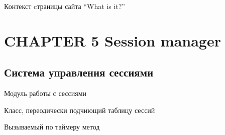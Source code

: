 \documentclass[letterpaper,10pt,english]{sphinxmanual}
\begin{document}
\begin{fulllineitems}
\begin{fulllineitems}
\end{fulllineitems}


\begin{fulllineitems}
\label{messageManager:mainServer.messageManager.MessageManager.whatContext}
Контекст cтраницы сайта ``What is it?''

\end{fulllineitems}


\end{fulllineitems}



\chapter{CHAPTER 5 Session manager}
\label{sessionManager::doc}\label{sessionManager:chapter-5-session-manager}

\section{Система управления сессиями}
\label{sessionManager:id1}\label{sessionManager:module-mainServer.sessionManager}
Модуль работы с сессиями

\begin{fulllineitems}
\label{sessionManager:mainServer.sessionManager.CheckSessionWorker}
Класс, переодически подчиющий таблицу сессий

\begin{fulllineitems}
\label{sessionManager:mainServer.sessionManager.CheckSessionWorker.work}
Вызываемый по таймеру метод

\end{fulllineitems}


\end{fulllineitems}

\end{document}
